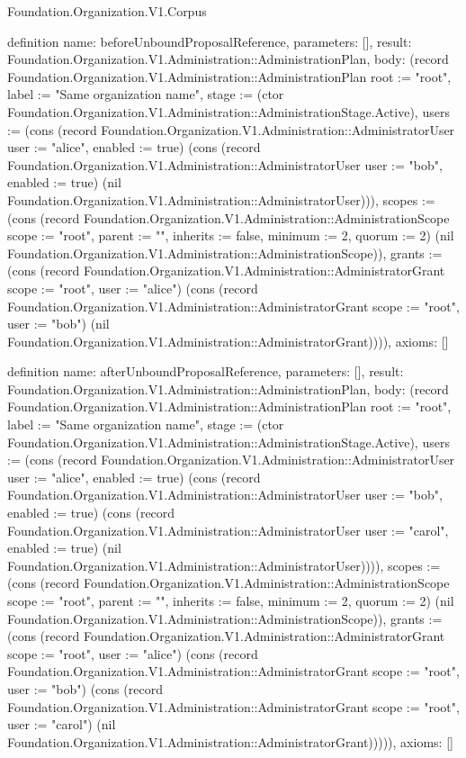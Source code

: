 \begin{lexlean}{Foundation.Organization.V1.Corpus}
\begin{semanticmodule}
definition{
  name: beforeUnboundProposalReference,
  parameters: [],
  result: Foundation.Organization.V1.Administration::AdministrationPlan,
  body: (record Foundation.Organization.V1.Administration::AdministrationPlan {root := "root", label := "Same organization name", stage := (ctor Foundation.Organization.V1.Administration::AdministrationStage.Active), users := (cons (record Foundation.Organization.V1.Administration::AdministratorUser {user := "alice", enabled := true}) (cons (record Foundation.Organization.V1.Administration::AdministratorUser {user := "bob", enabled := true}) (nil Foundation.Organization.V1.Administration::AdministratorUser))), scopes := (cons (record Foundation.Organization.V1.Administration::AdministrationScope {scope := "root", parent := "", inherits := false, minimum := 2, quorum := 2}) (nil Foundation.Organization.V1.Administration::AdministrationScope)), grants := (cons (record Foundation.Organization.V1.Administration::AdministratorGrant {scope := "root", user := "alice"}) (cons (record Foundation.Organization.V1.Administration::AdministratorGrant {scope := "root", user := "bob"}) (nil Foundation.Organization.V1.Administration::AdministratorGrant)))}),
  axioms: []
}

definition{
  name: afterUnboundProposalReference,
  parameters: [],
  result: Foundation.Organization.V1.Administration::AdministrationPlan,
  body: (record Foundation.Organization.V1.Administration::AdministrationPlan {root := "root", label := "Same organization name", stage := (ctor Foundation.Organization.V1.Administration::AdministrationStage.Active), users := (cons (record Foundation.Organization.V1.Administration::AdministratorUser {user := "alice", enabled := true}) (cons (record Foundation.Organization.V1.Administration::AdministratorUser {user := "bob", enabled := true}) (cons (record Foundation.Organization.V1.Administration::AdministratorUser {user := "carol", enabled := true}) (nil Foundation.Organization.V1.Administration::AdministratorUser)))), scopes := (cons (record Foundation.Organization.V1.Administration::AdministrationScope {scope := "root", parent := "", inherits := false, minimum := 2, quorum := 2}) (nil Foundation.Organization.V1.Administration::AdministrationScope)), grants := (cons (record Foundation.Organization.V1.Administration::AdministratorGrant {scope := "root", user := "alice"}) (cons (record Foundation.Organization.V1.Administration::AdministratorGrant {scope := "root", user := "bob"}) (cons (record Foundation.Organization.V1.Administration::AdministratorGrant {scope := "root", user := "carol"}) (nil Foundation.Organization.V1.Administration::AdministratorGrant))))}),
  axioms: []
}


\end{semanticmodule}
\end{lexlean}
